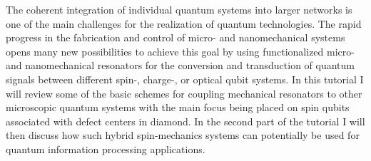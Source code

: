 The coherent integration of individual quantum systems into larger networks is one of the main challenges for the realization of quantum technologies. The rapid progress in the fabrication and control of micro- and nanomechanical systems opens many new possibilities to achieve this goal by using functionalized micro- and nanomechanical resonators  for the conversion and transduction of quantum signals between different spin-, charge-,  or optical qubit systems. In this tutorial I will review some of the basic schemes for coupling mechanical resonators to other microscopic quantum systems with the main focus being placed on spin qubits associated with defect centers in diamond. In the second part of the tutorial I will then discuss how such hybrid spin-mechanics systems can potentially be used for quantum information processing applications.